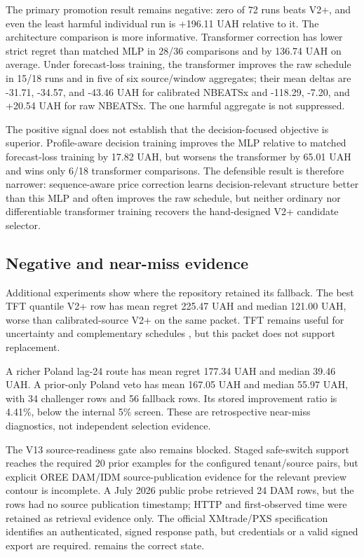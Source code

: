 The primary promotion result remains negative: zero of 72 runs beats V2+, and even the least harmful individual run is +196.11 UAH relative to it. The architecture comparison is more informative. Transformer correction has lower strict regret than matched MLP in 28/36 comparisons and by 136.74 UAH on average. Under forecast-loss training, the transformer improves the raw schedule in 15/18 runs and in five of six source/window aggregates; their mean deltas are -31.71, -34.57, and -43.46 UAH for calibrated NBEATSx and -118.29, -7.20, and +20.54 UAH for raw NBEATSx. The one harmful aggregate is not suppressed.

The positive signal does not establish that the decision-focused objective is superior. Profile-aware decision training improves the MLP relative to matched forecast-loss training by 17.82 UAH, but worsens the transformer by 65.01 UAH and wins only 6/18 transformer comparisons. The defensible result is therefore narrower: sequence-aware price correction learns decision-relevant structure better than this MLP and often improves the raw schedule, but neither ordinary nor differentiable transformer training recovers the hand-designed V2+ candidate selector.

\subsection{Negative and near-miss evidence}

Additional experiments show where the repository retained its fallback. The best TFT quantile V2+ row has mean regret 225.47 UAH and median 121.00 UAH, worse than calibrated-source V2+ on the same packet. TFT remains useful for uncertainty and complementary schedules \cite{lim2021tft,jiang2024ptft}, but this packet does not support replacement.

A richer Poland lag-24 route has mean regret 177.34 UAH and median 39.46 UAH. A prior-only Poland veto has mean 167.05 UAH and median 55.97 UAH, with 34 challenger rows and 56 fallback rows. Its stored improvement ratio is 4.41\%, below the internal 5\% screen. These are retrospective near-miss diagnostics, not independent selection evidence.

The V13 source-readiness gate also remains blocked. Staged safe-switch support reaches the required 20 prior examples for the configured tenant/source pairs, but explicit OREE DAM/IDM source-publication evidence for the relevant preview contour is incomplete. A July 2026 public probe retrieved 24 DAM rows, but the rows had no source publication timestamp; HTTP  and first-observed time were retained as retrieval evidence only. The official XMtrade/PXS specification identifies an authenticated, signed response path, but credentials or a valid signed export are required.  remains the correct state.
